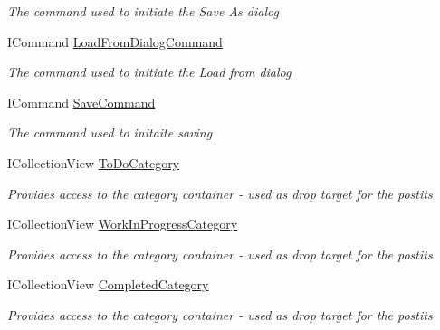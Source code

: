 \begin{DoxyCompactItemize}
\begin{DoxyCompactList}\small\item\em The command used to initiate the Save As dialog \end{DoxyCompactList}\item 
I\+Command \hyperlink{class_kanban_board_1_1_view_model_1_1_main_view_model_ac78c41a4e5c852c2afdd853439def3b0}{Load\+From\+Dialog\+Command}
\begin{DoxyCompactList}\small\item\em The command used to initiate the Load from dialog \end{DoxyCompactList}\item 
I\+Command \hyperlink{class_kanban_board_1_1_view_model_1_1_main_view_model_ae8b5f8979602622e17bc76d377c8b4c2}{Save\+Command}
\begin{DoxyCompactList}\small\item\em The command used to initaite saving \end{DoxyCompactList}\item 
I\+Collection\+View \hyperlink{class_kanban_board_1_1_view_model_1_1_main_view_model_a4896420588efd2aad29351a8d8d53657}{To\+Do\+Category}
\begin{DoxyCompactList}\small\item\em Provides access to the category container -\/ used as drop target for the postits \end{DoxyCompactList}\item 
I\+Collection\+View \hyperlink{class_kanban_board_1_1_view_model_1_1_main_view_model_abab8ec3a18854b226218782bcbee971b}{Work\+In\+Progress\+Category}
\begin{DoxyCompactList}\small\item\em Provides access to the category container -\/ used as drop target for the postits \end{DoxyCompactList}\item 
I\+Collection\+View \hyperlink{class_kanban_board_1_1_view_model_1_1_main_view_model_aa3cb439ea891ec13ad4ab256efa0fc2a}{Completed\+Category}
\begin{DoxyCompactList}\small\item\em Provides access to the category container -\/ used as drop target for the postits \end{DoxyCompactList}\end{DoxyCompactItemize}
